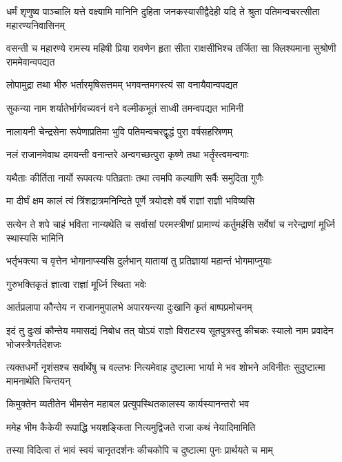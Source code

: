 \onelineshloka
{धर्मं शृणुष्व पाञ्चालि यत्ते वक्ष्यामि मानिनि}
\twolineshloka
{दुहिता जनकस्यासीद्वैदेही यदि ते श्रुता}
{पतिमन्वचरत्सीता महारण्यनिवासिनम्}


\threelineshloka
{वसन्ती च महारण्ये रामस्य महिषी प्रिया}
{रावणेन हृता सीता राक्षसीभिश्च तर्जिता}
{सा क्लिश्यमाना सुश्रोणी राममेवान्वपद्यत}


\twolineshloka
{लोपामुद्रा तथा भीरु भर्तारमृषिसत्तमम्}
{भगवन्तमगस्त्यं सा वनायैवान्वपद्यत}


\twolineshloka
{सुकन्या नाम शर्यातेर्भार्गवच्यवनं वने}
{वल्मीकभूतं साध्वी तमन्वपद्यत भामिनी}


\twolineshloka
{नालायनी चेन्द्रसेना रूपेणाप्रतिमा भुवि}
{पतिमन्वचरद्वृद्धं पुरा वर्षसहस्रिणम्}


\twolineshloka
{नलं राजानमेवाथ दमयन्ती वनान्तरे}
{अन्वगच्छत्पुरा कृष्णे तथा भर्तॄंस्त्वमन्वगाः}


\twolineshloka
{यथैताः कीर्तिता नार्यो रूपवत्यः पतिव्रताः}
{तथा त्वमपि कल्याणि सर्वैः समुदिता गुणैः}


\twolineshloka
{मा दीर्घं क्षम कालं त्वं त्रिंशद्रात्रमनिन्दिते}
{पूर्णे त्रयोदशे वर्षे राज्ञां राज्ञी भविष्यसि}


\onelineshloka
{सत्येन ते शपे चाहं भविता नान्यथेति च}
\twolineshloka
{सर्वासां परमस्त्रीणां प्रामाण्यं कर्तुमर्हसि}
{सर्वेषां च नरेन्द्राणां मूर्ध्नि स्थास्यसि भामिनि}


\twolineshloka
{भर्तृभक्त्या च वृत्तेन भोगानाप्स्यसि दुर्लभान्}
{यातायां तु प्रतिज्ञायां महान्तं भोगमाप्नुयाः}


\onelineshloka
{गुरुभक्तिकृतं ज्ञात्वा राज्ञां मूर्ध्नि स्थिता भवेः}



\twolineshloka
{आर्तप्रलापा कौन्तेय न राजानमुपालभे}
{अपारयन्त्या दुःखानि कृतं बाष्पप्रमोचनम्}


\onelineshloka
{इदं तु दुःखं कौन्तेय ममासद्यं निबोध तत्}
\twolineshloka
{योऽयं राज्ञो विराटस्य सूतपुत्रस्तु कीचकः}
{स्यालो नाम प्रवादेन भोजस्त्रैगर्तदेशजः}


\threelineshloka
{त्यक्तधर्मो नृशंसश्च सर्वार्थेषु च वल्लभः}
{नित्यमेवाह दुष्टात्मा भार्या मे भव शोभने}
{अविनीतः सुदुष्टात्मा मामनाथेति चिन्तयन्}


\twolineshloka
{किमुक्तेन व्यतीतेन भीमसेन महाबल}
{प्रत्युपस्थितकालस्य कार्यस्यानन्तरो भव}


\twolineshloka
{ममेह भीम कैकेयी रूपाद्धि भयशङ्किता}
{नित्यमुद्विजते राजा कथं नेयादिमामिति}


\twolineshloka
{तस्या विदित्वा तं भावं स्वयं चानृतदर्शनः}
{कीचकोपि च दुष्टात्मा पुनः प्रार्थयते च माम्}


